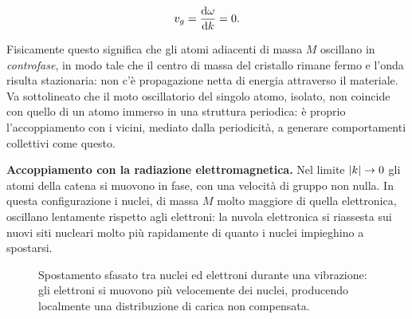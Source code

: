 \begin{equation}
    v_g = \dv{\omega}{k} = 0.
\end{equation}

Fisicamente questo significa che gli atomi adiacenti di massa \( M \) oscillano in \emph{controfase}, in modo tale che il centro di massa del cristallo rimane fermo e l'onda risulta stazionaria: non c'è propagazione netta di energia attraverso il materiale. Va sottolineato che il moto oscillatorio del singolo atomo, isolato, non coincide con quello di un atomo immerso in una struttura periodica: è proprio l'accoppiamento con i vicini, mediato dalla periodicità, a generare comportamenti collettivi come questo.

\textbf{Accoppiamento con la radiazione elettromagnetica.} Nel limite \( \abs{k} \to 0 \) gli atomi della catena si muovono in fase, con una velocità di gruppo non nulla. In questa configurazione i nuclei, di massa \( M \) molto maggiore di quella elettronica, oscillano lentamente rispetto agli elettroni: la nuvola elettronica si riassesta sui nuovi siti nucleari molto più rapidamente di quanto i nuclei impieghino a spostarsi.

\begin{figure}[htbp]
    \centering
    \caption{Spostamento sfasato tra nuclei ed elettroni durante una vibrazione: gli elettroni si muovono più velocemente dei nuclei, producendo localmente una distribuzione di carica non compensata.}
    \label{fig:dipoli_vibrazione}
\end{figure}

